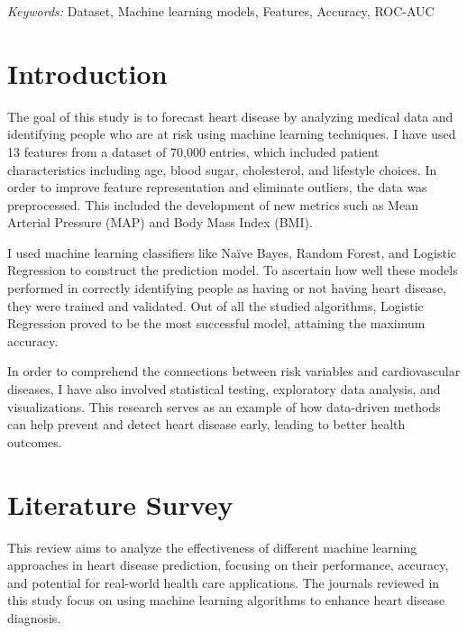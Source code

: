 \documentclass[12pt]{article}
\begin{document}
\noindent%
{\it Keywords:}  Dataset, Machine learning models, Features, Accuracy, ROC-AUC
\vfill

\newpage
\tableofcontents
\newpage

\section{Introduction}
The goal of this study is to forecast heart disease by analyzing medical data and identifying people who are at risk using machine learning techniques. I have used 13 features from a dataset of 70,000 entries, which included patient characteristics including age, blood sugar, cholesterol, and lifestyle choices. In order to improve feature representation and eliminate outliers, the data was preprocessed. This included the development of new metrics such as Mean Arterial Pressure (MAP) and Body Mass Index (BMI).

I  used machine learning classifiers like Naïve Bayes, Random Forest, and Logistic Regression to construct the prediction model. To ascertain how well these models performed in correctly identifying people as having or not having heart disease, they were trained and validated. Out of all the studied algorithms, Logistic Regression proved to be the most successful model, attaining the maximum accuracy.

In order to comprehend the connections between risk variables and cardiovascular diseases, I have also involved statistical testing, exploratory data analysis, and visualizations. This research serves as an example of how data-driven methods can help prevent and detect heart disease early, leading to better health outcomes.
\section{Literature Survey}
\label{sec:intro}

This review aims to analyze the effectiveness of different machine learning approaches in heart disease prediction, focusing on their performance, accuracy, and potential for real-world health care applications. The journals reviewed in this study focus on using machine learning algorithms to enhance heart disease diagnosis.
\end{document}

